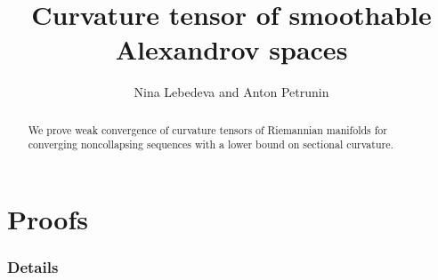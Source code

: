 \documentclass[a4paper]{article}
\begin{document}


\title{Curvature tensor of smoothable Alexandrov spaces}
\date{}
\author{Nina Lebedeva and Anton Petrunin} 
\maketitle

\begin{abstract}
We prove weak convergence of curvature tensors of Riemannian manifolds 
for converging noncollapsing sequences with a lower bound on sectional curvature.
\end{abstract}




\tableofcontents




\part*{Proofs}











%

%
%
%

\section*{Details}






{\sloppy

\def\emph{\textit}
\printbibliography[heading=bibintoc]
\fussy
}
\end{document}
